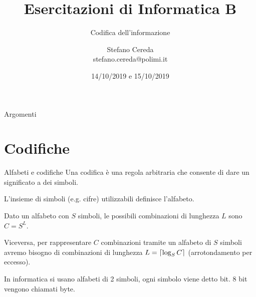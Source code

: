 \documentclass[aspectratio=169, ]{beamer}
\title{Esercitazioni di Informatica B}
\subtitle{Codifica dell'informazione}
\author{Stefano Cereda\\
	stefano.cereda@polimi.it
}
\date{14/10/2019 e 15/10/2019}
\institute[PoliMi]{Politecnico Milano}
\DeclarePairedDelimiter{\ceil}{\lceil}{\rceil}
\begin{document}
	\begin{frame}
	\maketitle
	\end{frame}


	\begin{frame}{Argomenti}
	\tableofcontents
	\end{frame}

\section{Codifiche}

\begin{frame}{Alfabeti e codifiche}
Una codifica è una regola arbitraria che consente di dare un significato a dei simboli.

L'insieme di simboli (e.g. cifre) utilizzabili definisce l'alfabeto.

\pause
Dato un alfabeto con $S$ simboli, le possibili combinazioni di lunghezza $L$ sono $C = S^L$.

\pause
Viceversa, per rappresentare $C$ combinazioni tramite un alfabeto di $S$ simboli avremo bisogno di combinazioni di lunghezza $L = \ceil{\log_S C}$ (arrotondamento per eccesso).

\pause
In informatica si usano alfabeti di 2 simboli, ogni simbolo viene detto \alert{bit}. 8 bit vengono chiamati \alert{byte}.
\end{frame}
\end{document}
